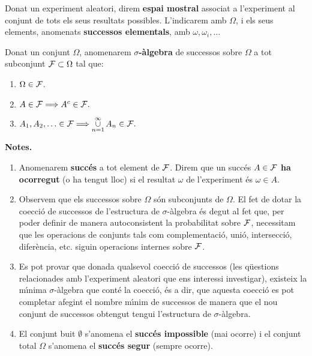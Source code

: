 \begin{defin}
Donat un experiment aleatori, direm {\bf espai mostral}
associat a l'experiment al conjunt de tots els seus resultats possibles. 
L'indicarem amb $\Omega$, i els seus elements, anomenats {\bf successos
elementals}, amb $\omega, \omega_i, \ldots$
\end{defin}

\begin{defin}
Donat un conjunt $\Omega$, anomenarem {\bf $\sigma$-\`algebra} de successos
sobre $\Omega$ a tot subconjunt ${\cal F} \subset \Omega$ tal que:

\begin{enumerate}

\item $\Omega \in {\cal F}$.

\item $A \in {\cal F} \Longrightarrow A^c \in {\cal F}.$

\item $\displaystyle A_1, A_2, \ldots \in {\cal F} \Longrightarrow
\mathop{\cup}\limits_{n=1}^\infty A_n \in {\cal F}.$

\end{enumerate}
\end{defin}

{\bf Notes.}

\begin{enumerate}

\item Anomenarem {\bf succ\'es} a tot element de ${\cal F}$. 
Direm que un succ\'es $A\in {\cal F}$ {\bf ha ocorregut} (o ha tengut lloc)
si el resultat $\omega$ de l'experiment \'es $\omega\in A$.

\item Observem que els successos sobre $\Omega$ s\'on subconjunts de $\Omega$.
El fet de dotar la co{\lgem}ecci\'o de successos de l'estructura de 
$\sigma$-\`algebra \'es degut al fet que, per poder definir de manera autoconsistent
la probabilitat sobre ${\cal F}$, necessitam que les 
operacions de conjunts tals 
com complementaci\'o, uni\'o, intersecci\'o, difer\`encia, etc. siguin 
operacions internes sobre ${\cal F}$.

\item Es pot provar que donada qualsevol co{\lgem}ecci\'o de successos (les
q\"uestions relacionades amb l'experiment aleatori que ens interessi
investigar), existeix la m\'{\i}nima $\sigma$-\`algebra que cont\'e la
co{\lgem}ecci\'o, \'es a dir, que aquesta co{\lgem}ecci\'o es pot completar afegint el
nombre m\'{\i}nim de successos de manera que el nou conjunt de successos
obtengut tengui l'estructura de $\sigma$-\`algebra.

\item El conjunt buit $\emptyset$ s'anomena el {\bf succ\'es
impossible} (mai ocorre) i el conjunt total 
$\Omega$ s'anomena el {\bf succ\'es segur}
(sempre ocorre).

\end{enumerate}

